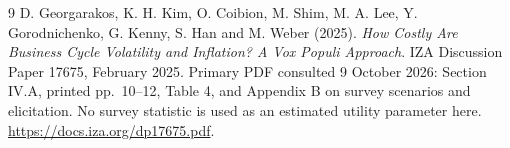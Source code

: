 \documentclass[11pt]{article}
\theoremstyle{remark}
\begin{document}
\begin{thebibliography}{9}
 D. Georgarakos, K. H. Kim, O. Coibion, M. Shim,
M. A. Lee, Y. Gorodnichenko, G. Kenny, S. Han and M. Weber (2025).
\emph{How Costly Are Business Cycle Volatility and Inflation? A Vox Populi
Approach}. IZA Discussion Paper 17675, February 2025. Primary PDF
consulted 9 October 2026: Section IV.A, printed pp.~10--12, Table 4,
and Appendix B on survey scenarios and elicitation. No survey statistic
is used as an estimated utility parameter here.
\url{https://docs.iza.org/dp17675.pdf}.
\end{thebibliography}
\end{document}

